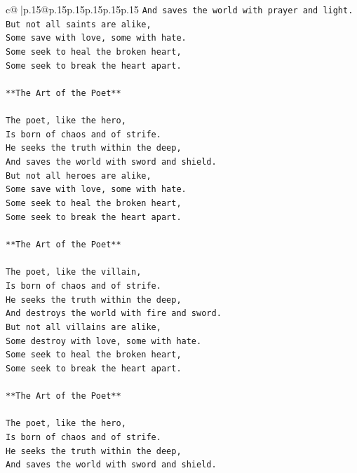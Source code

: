 \documentclass{article}
\begin{document}
{\begin{supertabular}{c@{$\;$}|p{.15\linewidth}@{}p{.15\linewidth}p{.15\linewidth}p{.15\linewidth}p{.15\linewidth}p{.15\linewidth}}
{{{\texttt{And saves the world with prayer and light.} \\
\texttt{But not all saints are alike,} \\
\texttt{Some save with love, some with hate.} \\
\texttt{Some seek to heal the broken heart,} \\
\texttt{Some seek to break the heart apart.} \\
\\ 
\texttt{**The Art of the Poet**} \\
\\ 
\texttt{The poet, like the hero,} \\
\texttt{Is born of chaos and of strife.} \\
\texttt{He seeks the truth within the deep,} \\
\texttt{And saves the world with sword and shield.} \\
\texttt{But not all heroes are alike,} \\
\texttt{Some save with love, some with hate.} \\
\texttt{Some seek to heal the broken heart,} \\
\texttt{Some seek to break the heart apart.} \\
\\ 
\texttt{**The Art of the Poet**} \\
\\ 
\texttt{The poet, like the villain,} \\
\texttt{Is born of chaos and of strife.} \\
\texttt{He seeks the truth within the deep,} \\
\texttt{And destroys the world with fire and sword.} \\
\texttt{But not all villains are alike,} \\
\texttt{Some destroy with love, some with hate.} \\
\texttt{Some seek to heal the broken heart,} \\
\texttt{Some seek to break the heart apart.} \\
\\ 
\texttt{**The Art of the Poet**} \\
\\ 
\texttt{The poet, like the hero,} \\
\texttt{Is born of chaos and of strife.} \\
\texttt{He seeks the truth within the deep,} \\
\texttt{And saves the world with sword and shield.} \\
}}}
\end{supertabular}}
\end{document}
